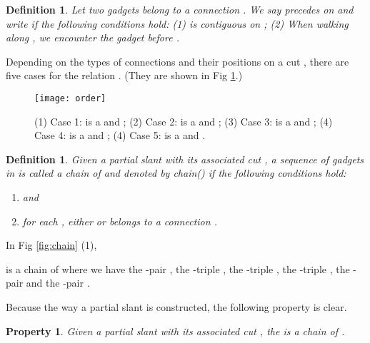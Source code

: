 \documentclass[11pt]{article}
\newtheorem{definition}[figure]{Definition}
\newtheorem{property}[figure]{Property}
\begin{document}
\begin{definition}\label{def:lessthan}
Let two gadgets  belong to a connection .
We say  { \em precedes}  on  and write
 if the following conditions hold:
(1)  is contiguous on ;
(2) When walking along , we encounter the gadget 
before .
\end{definition}

Depending on the types of connections and their positions on a cut ,
there are five cases for the relation .
(They are shown in Fig \ref{fig:order}.)



\begin{figure}[t]
\begin{center}
\texttt{[image: order]}
  \centering
\caption{(1) Case 1:  is a  and
;
(2) Case 2:  is a  and
;
(3) Case 3:  is a  and
;
(4) Case 4:  is a  and
;
(4) Case 5:  is a  and
.}

\label{fig:order}
\end{center}
\end{figure}

\begin{definition}\label{def:chain}
Given a partial slant   with its associated cut ,
a sequence of gadgets  in 
is called a chain of  and denoted by \emph{chain}()
if the following conditions hold:
\begin{enumerate}
\item  and

\item for each ,
either  or  belongs to
a connection .
\end{enumerate}
\end{definition}

In Fig \ref{fig:chain} (1),

is a chain of  where we have the -pair ,
the -triple ,
the -triple ,
the -triple ,
the -pair 
and
the -pair .









Because the way a partial slant   is constructed,
the following property is clear.
\begin{property}\label{prop:chain}
Given a partial slant   with its associated cut ,
the 
is a chain of .
\end{property}
\end{document}
